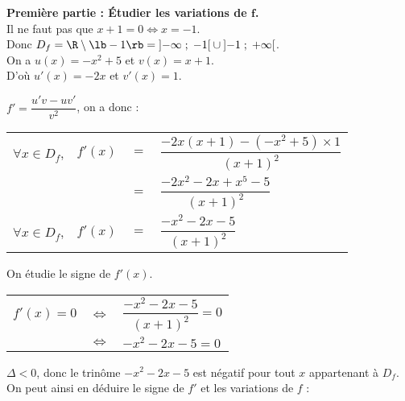 \textbf{Première partie : Étudier les variations de $\mathbf{f}$.} \\

Il ne faut pas que $x+1 = 0 \Longleftrightarrow x = -1$. \\

Donc $D_f = \R \setminus \lb -1 \rb = \left]-\infty\; ; \; -1\right[\cup\left]-1\; ; \; +\infty\right[$. \\

On a $u(x) = -x^2 + 5$ et $v(x) = x + 1$. \\
D'où $u'(x) = -2x$ et $v'(x) = 1$. \\

\vspace*{.3cm}

$f' = \dfrac{u'v - uv'}{v^2}$, on a donc :

\begin{tabular}{llll}
$\forall x \in D_f$, & $f'(x)$ & $=$ & $\dfrac{-2x\left(x+1\right)-\left(-x^2 + 5\right) \times 1}{\left(x+1\right)^2}$\vspace*{.3cm} \\
& & $=$ & $\dfrac{-2x^2 - 2x + x^5 - 5}{\left(x+1\right)^2}$ \vspace*{.3cm} \\
$\forall x \in D_f$, & $f'(x)$ & $=$ & $\dfrac{-x^2 - 2x - 5}{\left(x+1\right)^2}$ \vspace*{.3cm} \\
\end{tabular}

On étudie le signe de $f'(x)$. \\

\begin{tabular}{lll}
$f'(x) = 0$ & $\Longleftrightarrow$ & $\dfrac{-x^2 - 2x - 5}{\left(x+1\right)^2} = 0$ \vspace*{.3cm} \\
& $\Longleftrightarrow$ & $-x^2 - 2x - 5 = 0$ \vspace*{.3cm} \\
\end{tabular}

\vspace*{.3cm} 

$\Delta < 0$, donc le trinôme $-x^2 - 2x -5$ est négatif pour tout $x$ appartenant à $D_f$. \\

On peut ainsi en déduire le signe de $f'$ et les variations de $f$ : 

\vspace*{.2cm}

